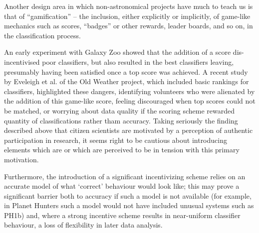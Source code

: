 \documentclass{ar2e}
\begin{document}


Another design area in which non-astronomical projects have much to teach us
is that of ``gamification'' -- the inclusion, either
explicitly or implicitly, of game-like mechanics such as scores, ``badges'' or
other rewards, leader boards, and so on, in the classification process.


An early experiment with Galaxy Zoo showed that the addition of a score
dis-incentivised poor classifiers, but also resulted in the best classifiers
leaving, presumably having been satisfied once a top score was achieved. A
recent study by Eveleigh et al. of the Old Weather project, which included
basic rankings for classifiers, highlighted these dangers, identifying
volunteers who were alienated by the addition of this game-like score, feeling
discouraged when top scores could not be matched, or worrying about data
quality if the scoring scheme rewarded quantity of classifications rather tham
accuracy. Taking seriously the finding described above that citizen scientists
are motivated by a perception of authentic participation in research, it seems
right to be cautious about introducing elements which are or which are
perceived to be in tension with this primary motivation. 


Furthermore, the
introduction of a significant incentivizing scheme relies on an accurate model
of what `correct' behaviour would look like; this may prove a significant
barrier both to accuracy if such a model is not available (for example, in
Planet Hunters such a model would not have included unusual systems such as
PH1b) and, where a strong incentive scheme results in near-uniform classifier
behaviour, a loss of flexibility in later data analysis. 
\end{document}
